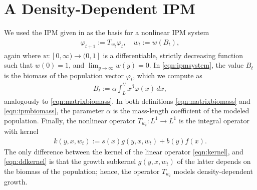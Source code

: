 \section{A Density-Dependent IPM} \label{section:ddipm}

We used the IPM given in \cite{Vindenes2014} as the basis for a nonlinear IPM system 
\begin{align}
	\varphi_{t+1} := T_{w_t} \varphi_t, \quad w_t:=w(B_t), \label{eqn:ipmsystem}
\end{align}
again where $w:[0,\infty) \to (0,1]$ is a differentiable, strictly decreasing function such that $w(0) = 1$, and $\lim_{y \to \infty} w(y) = 0$. In \eqref{eqn:ipmsystem}, the value $B_t$ is the biomass of the population vector $\varphi_t$, which we compute as
\begin{align}
	B_t:= \alpha \int_L^U x^\beta \varphi(x) \, dx, \label{eqn:ipmbiomass}
\end{align}
analogously to \eqref{eqn:matrixbiomass}. In both definitions \eqref{eqn:matrixbiomass} and \eqref{eqn:ipmbiomass}, the parameter $\alpha$ is the mass-length coefficient of the modeled population. Finally, the nonlinear operator $T_{w_t}:L^1 \to L^1$ is the integral operator with kernel
\begin{align}
	k(y, x, w_t) := s(x)g(y, x, w_t) + b(y)f(x). \label{eqn:ddkernel}
\end{align}
The only difference between the kernel of the linear operator \eqref{eqn:kernel}, and \eqref{eqn:ddkernel} is that the growth subkernel $g(y,x,w_t)$ of the latter depends on the biomass of the population; hence, the operator $T_{w_t}$ models density-dependent growth. 

